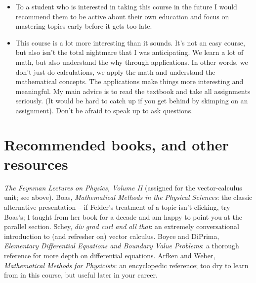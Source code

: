\documentclass{tufte-handout}
\begin{document}
\begin{itemize}
        course.
  \item To a student who is interested in taking this course in the
        future I would recommend them to be active about their own
        education and focus on mastering topics early before it gets
        too late.
  \item This course is a lot more interesting than it sounds. It's not
        an easy course, but also isn't the total nightmare that I was
        anticipating. We learn a lot of math, but also understand the
        why through applications. In other words, we don't just do
        calculations, we apply the math and understand the mathematical
        concepts. The applications make things more interesting and
        meaningful. My main advice is to read the textbook and take all
        assignments seriously. (It would be hard to catch up if you get
        behind by skimping on an assignment). Don't be afraid to speak
        up to ask questions.
\end{itemize}

\section{Recommended books, and other resources}\label{sec:resources}

 \textit{The Feynman Lectures on Physics, Volume
II} (assigned for the vector-calculus unit; see above). Boas,
\textit{Mathematical Methods in the Physical Sciences}: the classic
alternative presentation -- if Felder's treatment of a topic isn't
clicking, try Boas's; I taught from her book for a decade and am happy
to point you at the parallel section. Schey, \textit{div grad curl and
all that}: an extremely conversational introduction to (and refresher
on) vector calculus. Boyce and DiPrima, \textit{Elementary
Differential Equations and Boundary Value Problems}: a thorough
reference for more depth on differential equations. Arfken and Weber,
\textit{Mathematical Methods for Physicists}: an encyclopedic
reference; too dry to learn from in this course, but useful later in
your career.
\end{document}
